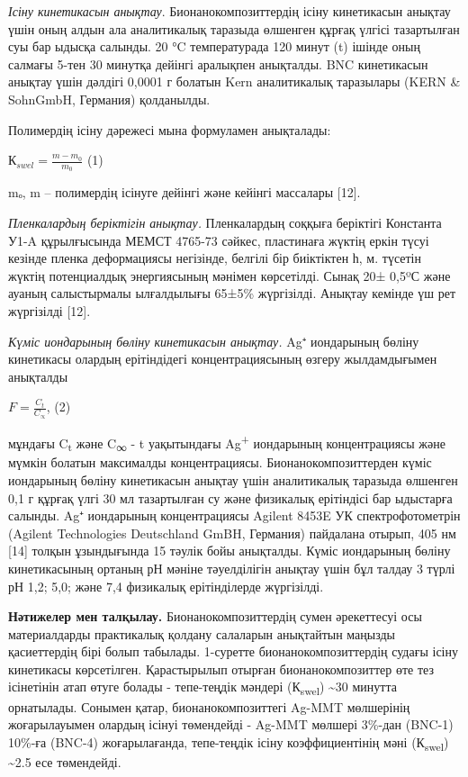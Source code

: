 \begin{multicols}{2}
\emph{Ісіну кинетикасын анықтау}. Бионанокомпозиттердің ісіну
кинетикасын анықтау үшін оның алдын ала аналитикалық таразыда өлшенген
құрғақ үлгісі тазартылған суы бар ыдысқа салынды. 20 °C температурада
120 минут (t) ішінде оның салмағы 5-тен 30 минутқа дейінгі аралықпен
анықталды. BNC кинетикасын анықтау үшін дәлдігі 0,0001 г болатын Kern
аналитикалық таразылары (KERN \& SohnGmbH, Германия) қолданылды.

Полимердің ісіну дәрежесі мына формуламен анықталады:

\(К_{swel} = \frac{m - m_{0}}{m_{0}}\) (1)

mₒ, m -- полимердің ісінуге дейінгі және кейінгі массалары {[}12{]}.

\emph{Пленкалардың беріктігін анықтау.} Пленкалардың соққыға беріктігі
Константа У1-A құрылғысында МЕМСТ 4765-73 сәйкес, пластинаға жүктің
еркін түсуі кезінде пленка деформациясы негізінде, белгілі бір
биіктіктен һ, м. түсетін жүктің потенциалдық энергиясының мәнімен
көрсетілді. Сынақ 20± 0,5ºС және ауаның салыстырмалы ылғалдылығы 65±5\%
жүргізілді. Анықтау кемінде үш рет жүргізілді {[}12{]}.

\emph{Күміс иондарының бөліну кинетикасын анықтау.} Ag⁺ иондарының
бөліну кинетикасы олардың ерітіндідегі концентрациясының өзгеру
жылдамдығымен анықталды

\(F = \frac{C_{t}}{C_{\propto}}\), (2)

мұндағы C\textsubscript{t} және C\textsubscript{∞} - t уақытындағы
Ag\textsuperscript{+} иондарының концентрациясы және мүмкін болатын
максималды концентрациясы. Бионанокомпозиттерден күміс иондарының бөліну
кинетикасын анықтау үшін аналитикалық таразыда өлшенген 0,1 г құрғақ
үлгі 30 мл тазартылған су және физикалық ерітіндісі бар ыдыстарға
салынды. Ag⁺ иондарының концентрациясы Agilent 8453E УК
спектрофотометрін (Agilent Technologies Deutschland GmBH, Германия)
пайдалана отырып, 405 нм {[}14{]} толқын ұзындығында 15 тәулік бойы
анықталды. Күміс иондарының бөліну кинетикасының ортаның рН мәніне
тәуелділігін анықтау үшін бұл талдау 3 түрлі рН 1,2; 5,0; және 7,4
физикалық ерітінділерде жүргізілді.

{\bfseries Нәтижелер мен талқылау.} Бионанокомпозиттердің сумен әрекеттесуі
осы материалдарды практикалық қолдану салаларын анықтайтын маңызды
қасиеттердің бірі болып табылады. 1-суретте бионанокомпозиттердің судағы
ісіну кинетикасы көрсетілген. Қарастырылып отырған бионанокомпозиттер
өте тез ісінетінін атап өтуге болады - тепе-теңдік мәндері
(К\textsubscript{swel}) \textasciitilde30 минутта орнатылады. Сонымен
қатар, бионанокомпозиттегі Ag-MMT мөлшерінің жоғарылауымен олардың
ісінуі төмендейді - Ag-MMT мөлшері 3\%-дан (BNC-1) 10\%-ға (BNC-4)
жоғарылағанда, тепе-теңдік ісіну коэффициентінің мәні
(К\textsubscript{swel}) \textasciitilde2.5 есе төмендейді.
\end{multicols}

